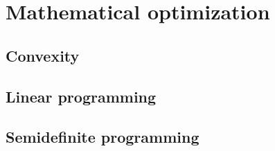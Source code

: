 \chapter{Mathematical optimization}
\thispagestyle{empty}  %
	
	\section{Convexity}

	\section{Linear programming}

	\section{Semidefinite programming}